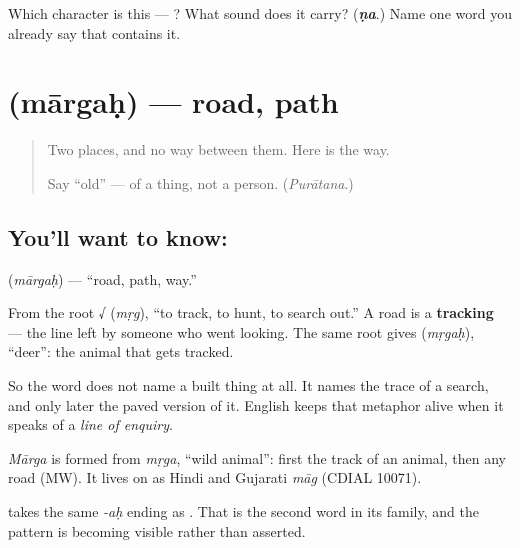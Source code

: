 \begin{tcolorbox}[breakable,colback=teal!4,colframe=teal!35!black,title={Before you move on}]
Which character is this — ? What sound does it carry? (\emph{\textbf{ṇa}}.) Name one word you already say that contains it.
\end{tcolorbox}
\section[\texorpdfstring{\sk{मार्गः} (mārgaḥ)}{मार्गः (mārgaḥ)}]{ (mārgaḥ) — road, path}

\label{lesson:SA-C16-road}



\begin{quote}
Two places, and no way between them. Here is the way.

Say \textquotedblleft{}old\textquotedblright{} — of a thing, not a person. (\emph{Purātana}.)
\end{quote}

\subsection*{You'll want to know: }
\textbf{} (\emph{mārgaḥ}) — \textquotedblleft{}road, path, way.\textquotedblright{}

From the root √ (\emph{mṛg}), \textquotedblleft{}to track, to hunt, to search out.\textquotedblright{} A road is a \textbf{tracking} — the line left by someone who went looking. The same root gives  (\emph{mṛgaḥ}), \textquotedblleft{}deer\textquotedblright{}: the animal that gets tracked.

So the word does not name a built thing at all. It names the trace of a search, and only later the paved version of it. English keeps that metaphor alive when it speaks of a \emph{line of enquiry}.

\begin{cousinweb}
\emph{Mārga} is formed from \emph{mṛga}, \textquotedblleft{}wild animal\textquotedblright{}: first the track of an animal, then any road (MW). It lives on as Hindi and Gujarati \emph{māg} (CDIAL 10071).
\end{cousinweb}

\begin{grammarlens}[title={What you've built}]
\emph{} takes the same \emph{-aḥ} ending as \emph{}. That is the second word in its family, and the pattern is becoming visible rather than asserted.
\end{grammarlens}

